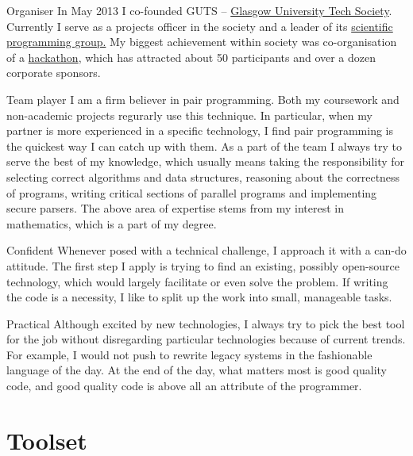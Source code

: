\documentclass{tccv}
\begin{document}
\begin{skillist}
\item{Organiser} {In May 2013 I co-founded GUTS -- \href{http://gutechsoc.com}{Glasgow University Tech Society}. Currently I serve as a projects officer in the society and a leader of its \href{http://fb.com/groups/scientificProgramming} {scientific programming group.} My biggest achievement within society was co-organisation of a \href{http://storify.com/Eventhread/gu-hackaton}{hackathon}, which has attracted about 50 participants and over a dozen corporate sponsors.}
\item{Team player} {I am a firm believer in pair programming. Both my coursework and non-academic projects regurarly use this technique. In particular, when my partner is more experienced in a specific technology, I find pair programming is the quickest way I can catch up with them. As a part of the team I always try to serve the best of my knowledge, which usually means taking the responsibility for selecting correct algorithms and data structures, reasoning about the correctness of programs, writing critical sections of parallel programs and implementing secure parsers. The above area of expertise stems from my interest in mathematics, which is a part of my degree.}
\item{Confident} {Whenever posed with a technical challenge, I approach it with a can-do attitude. The first step I apply is trying to find an existing, possibly open-source technology, which would largely facilitate or even solve the problem. If writing the code is a necessity, I like to split up the work into small, manageable tasks.}
\item{Practical} {Although excited by new technologies, I always try to pick the best tool for the job without disregarding particular technologies because of current trends. For example, I would not push to rewrite legacy systems in the fashionable language of the day.  At the end of the day, what matters most is good quality code, and good quality code is above all an attribute of the programmer.}
\end{skillist}


\section{Toolset}
\end{document}
